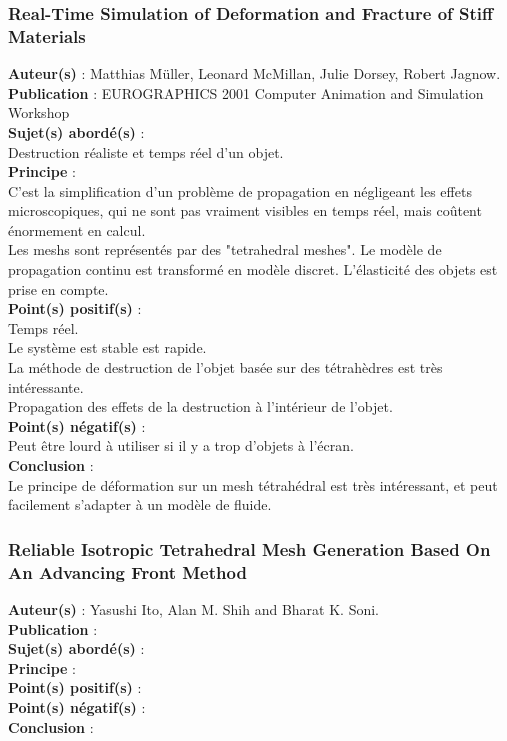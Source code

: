 \documentclass[a4paper,10pt]{article}
\begin{document}
\subsubsection{Real-Time Simulation of Deformation and Fracture of Stiff Materials}
\textbf{Auteur(s)} : Matthias Müller, Leonard McMillan, Julie Dorsey, Robert Jagnow.\\
\textbf{Publication} : EUROGRAPHICS 2001 Computer Animation and Simulation Workshop \\
\textbf{Sujet(s) abordé(s)} : \\
	Destruction réaliste et temps réel d'un objet. \\
\textbf{Principe} :\\	
	C'est la simplification d'un problème de propagation en négligeant les effets microscopiques, qui ne sont pas vraiment visibles en temps réel, mais coûtent énormement en calcul.\\
	Les meshs sont représentés par des "tetrahedral meshes". Le modèle de propagation continu est transformé en modèle discret. L'élasticité des objets est prise en compte.\\
\textbf{Point(s) positif(s)} :\\
	Temps réel.\\
	Le système est stable est rapide.\\
	La méthode de destruction de l'objet basée sur des tétrahèdres est très intéressante.\\
	Propagation des effets de la destruction à l'intérieur de l'objet.\\
\textbf{Point(s) négatif(s)} :\\
	Peut être lourd à utiliser si il y a trop d'objets à l'écran.\\
\textbf{Conclusion} :\\
	Le principe de déformation sur un mesh tétrahédral est très intéressant, et peut facilement s'adapter à un modèle de fluide.


\subsubsection{Reliable Isotropic Tetrahedral Mesh Generation Based On An Advancing Front Method}
\textbf{Auteur(s)} : Yasushi Ito, Alan M. Shih and Bharat K. Soni.\\
\textbf{Publication} :\\
\textbf{Sujet(s) abordé(s)} : \\
\textbf{Principe} :\\	
\textbf{Point(s) positif(s)} :\\
\textbf{Point(s) négatif(s)} :\\
\textbf{Conclusion} :\\
\end{document}
